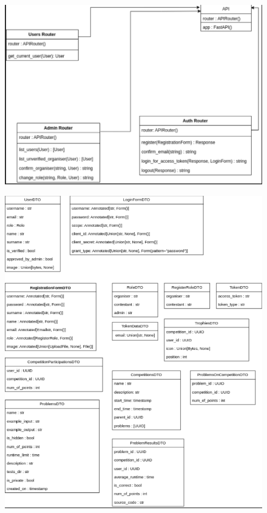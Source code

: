 			\begin{figure}[htbp]
				\centering
				\includegraphics[width=\linewidth]{slike/dijagram_razreda.png}
			\end{figure}
			
			

			\begin{figure}[htbp]
				\centering
				\includegraphics[width=\linewidth]{slike/dto.png}
			\end{figure}
			\eject
			
